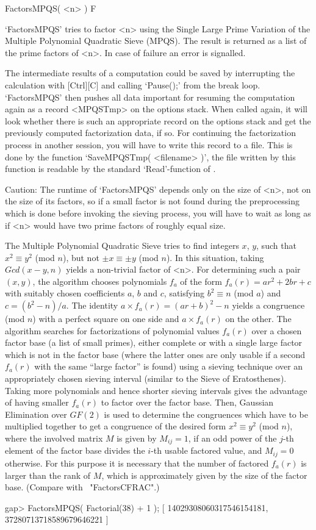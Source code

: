 
\>FactorsMPQS( <n> ) F

`FactorsMPQS' tries to factor <n> using the Single Large Prime
Variation of the Multiple Polynomial Quadratic Sieve (MPQS).
The result is returned as a list of the prime factors of <n>.
In case of failure an error is signalled.

The intermediate results of a computation could be saved by
interrupting the calculation with [Ctrl][C] and calling `Pause();'
from the break loop. `FactorsMPQS' then pushes all data important
for resuming the computation again as a record <MPQSTmp>
on the options stack. When called again, it will look whether
there is such an appropriate record on the options stack
and get the previously computed factorization data, if so. 
For continuing the factorization process in another 
session, you will have to write this record to a file.
This is done by the function `SaveMPQSTmp( <filename> )',
the file written by this function is readable by the 
standard `Read'-function of {\GAP}.

Caution: The runtime of `FactorsMPQS' depends only on the size of <n>, 
not on the size of its factors, so if a small factor is not found during
the preprocessing which is done before invoking the sieving process,
you will have to wait as long as if <n> would have two prime factors
of roughly equal size.

The Multiple Polynomial Quadratic Sieve
tries to find integers $x$, $y$, such that $x^2 \equiv y^2$ (mod $n$),
but not $\pm x \equiv \pm y$ (mod $n$). In this situation,
taking $Gcd(x - y,n)$ yields a non-trivial factor of <n>.
For determining such a pair $(x,y)$, the algorithm chooses polynomials
$f_a$ of the form $f_a(r) = ar^2 + 2br + c$ with suitably chosen
coefficients $a$, $b$ and $c$, satisfying $b^2 \equiv n$ (mod $a$)
and $c = (b^2 - n)/a$.
The identity $a \times f_a(r) = (ar + b)^2 - n$ yields a congruence
(mod $n$) with a perfect square on one side and $a \times f_a(r)$ on
the other. The algorithm searches for factorizations of polynomial values 
$f_a(r)$ over a chosen factor base (a list of small primes),
either complete or with a single large factor which is not in the
factor base (where the latter ones are only usable if a second $f_a(r)$
with the same ``large factor'' is found) using a sieving technique over
an appropriately chosen
sieving interval 
(similar to the Sieve of Eratosthenes).
Taking more polynomials and hence shorter sieving intervals gives
the advantage of having smaller $f_a(r)$ to factor over the factor base.
Then, Gaussian Elimination over $GF(2)$ is used to determine the
congruences which have to be multiplied together to get a congruence
of the desired form $x^2 \equiv y^2$ (mod $n$), where the involved 
matrix $M$ is given by $M_{ij} = 1$, if an odd power of the $j$-th 
element of the factor base divides the $i$-th usable factored
value, and $M_{ij} = 0$ otherwise.
For this purpose it is necessary that the number of factored 
$f_a(r)$ is larger than the rank of $M$, which is approximately
given by the size of the factor base.
(Compare with ~"FactorsCFRAC".)

\beginexample
gap> FactorsMPQS( Factorial(38) + 1 );
[ 14029308060317546154181, 37280713718589679646221 ]
\endexample


